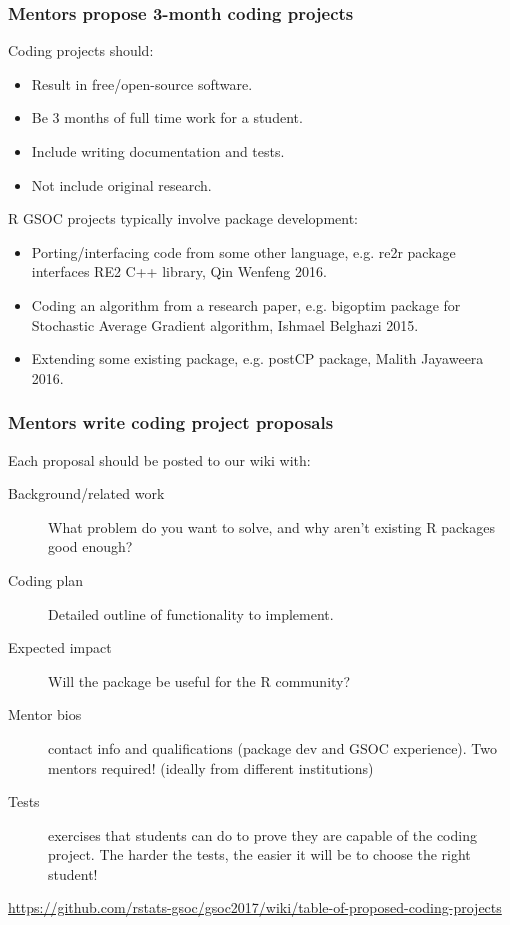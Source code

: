 \documentclass{beamer}
\begin{document}
\begin{frame}
  \frametitle{Mentors propose 3-month coding projects}
  Coding projects should:
  \begin{itemize}
  \item Result in free/open-source software.
  \item Be 3 months of full time work for a student.
  \item Include writing documentation and tests.
  \item Not include original research.
  \end{itemize}
  R GSOC projects typically involve package development: 
  \begin{itemize}
  \item Porting/interfacing code from some other language, e.g. re2r
    package interfaces RE2 C++ library, Qin Wenfeng 2016.
  \item Coding an algorithm from a research paper, e.g. bigoptim
    package for Stochastic Average Gradient algorithm, Ishmael
    Belghazi 2015.
  \item Extending some existing package, e.g. postCP package, Malith
    Jayaweera 2016.
  \end{itemize}
\end{frame}

\begin{frame}
  \frametitle{Mentors write coding project proposals}
  Each proposal should be posted to our wiki with:
  \begin{description}
  \item[Background/related work] What problem do you want to solve,
    and why aren't existing R packages good enough?
  \item[Coding plan] Detailed outline of functionality to implement.
  \item[Expected impact] Will the package be useful for the R
    community?
  \item[Mentor bios] contact info and qualifications (package dev and
    GSOC experience). Two mentors required! (ideally from different institutions)
  \item[Tests] exercises that students can do to prove they are
    capable of the coding project. The harder the tests, the easier it
    will be to choose the right student!
  \end{description}

\url{https://github.com/rstats-gsoc/gsoc2017/wiki/table-of-proposed-coding-projects}
\end{frame}
\end{document}
